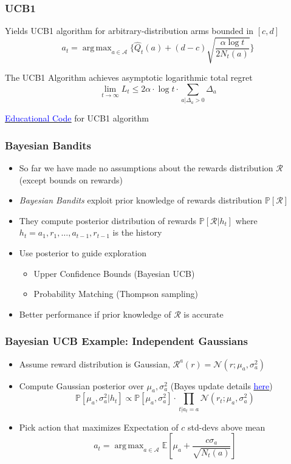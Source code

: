 \documentclass[handout]{beamer}
\DeclareMathOperator*{\argmax}{arg\,max}
\begin{document}
\begin{frame}
\frametitle{UCB1}
\pause
Yields UCB1 algorithm for arbitrary-distribution arms bounded in $[c,d]$
$$a_t = \argmax_{a\in \mathcal{A}} \{ \hat{Q}_t(a) + (d-c)\sqrt{\frac {\alpha \log t} {2N_t(a)}} \}$$
\begin{theorem}
The UCB1 Algorithm achieves asymptotic logarithmic total regret
$$\lim_{t\rightarrow \infty} L_t \leq 2\alpha \cdot \log t \cdot \sum_{a|\Delta_a > 0} \Delta_a$$
\end{theorem}
\href{https://github.com/coverdrive/MDP-DP-RL/blob/master/src/algorithms/mab/ucb1.py}{\underline{\textcolor{blue}{Educational Code}}} for UCB1 algorithm
\end{frame}

\begin{frame}
\frametitle{Bayesian Bandits}
\pause
\begin{itemize}
\item So far we have made no assumptions about the rewards distribution $\mathcal{R}$ (except bounds on rewards)
\item {\em Bayesian Bandits} exploit prior knowledge of rewards distribution $\mathbb{P}[\mathcal{R}]$
\item They compute posterior distribution of rewards $\mathbb{P}[\mathcal{R}|h_t]$ where $h_t = a_1,r_1, \ldots, a_{t-1}, r_{t-1}$ is the history
\item Use posterior to guide exploration
\begin{itemize}
\item Upper Confidence Bounds (Bayesian UCB)
\item Probability Matching (Thompson sampling)
\end{itemize}
\item Better performance if prior knowledge of $\mathcal{R}$ is accurate
\end{itemize}
\end{frame}

\begin{frame}
\frametitle{Bayesian UCB Example: Independent Gaussians}
\pause
\begin{itemize}[<+->]
\item Assume reward distribution is Gaussian, $\mathcal{R}^a(r) =\mathcal{N}(r;\mu_a, \sigma_a^2)$
\item Compute Gaussian posterior over $\mu_a,\sigma_a^2$  (Bayes update details \href{https://people.eecs.berkeley.edu/~jordan/courses/260-spring10/lectures/lecture5.pdf}{\underline{\textcolor{blue}{here}}})
$$\mathbb{P}[\mu_a, \sigma_a^2|h_t] \propto \mathbb{P}[\mu_a, \sigma_a^2] \cdot \prod_{t|a_t=a} \mathcal{N}(r_t;\mu_a, \sigma_a^2)$$
\item Pick action that maximizes Expectation of $c$ std-devs above mean
$$a_t = \argmax_{a\in\mathcal{A}} \mathbb{E}[\mu_a + \frac {c \sigma_a} {\sqrt{N_t(a)}}]$$
\end{itemize}
\end{frame}
\end{document}
